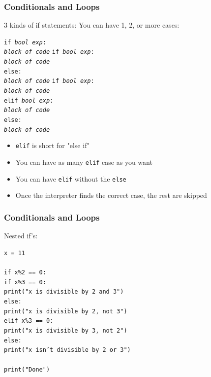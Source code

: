 \documentclass{beamer}
\newcommand{\code}[1]{\texttt{#1}}
\newcommand{\tab}{\hspace*{22pt}}
\begin{document}
\begin{frame}%
	\frametitle{Conditionals and Loops}
	
	\begin{block}{3 kinds of if statements:}
		You can have 1, 2, or more cases:
		
			\code{if \emph{bool exp}: \\
				\tab \emph{block of code}}
		\endminipage\hfill
			\code{if \emph{bool exp}: \\
				\tab \emph{block of code} \\
				else: \\
				\tab \emph{block of code}}
		\endminipage\hfill
			\code{if \emph{bool exp}: \\
				\tab \emph{block of code} \\
				elif \emph{bool exp}: \\
				\tab \emph{block of code} \\
				else: \\
				\tab \emph{block of code}}
		\endminipage\hfill
		
			\begin{itemize}
				\item \code{elif} is short for "else if"
				\item You can have as many \code{elif} case as you want
				\item You can have \code{elif} without the \code{else}
				\item Once the interpreter finds the correct case, the rest are skipped
			\end{itemize}
	\end{block}
	
\end{frame}

\begin{frame}%
	\frametitle{Conditionals and Loops}
	
	\begin{block}{Nested if's:}
		
		\code{x = 11 \\
				\tab \\
				if x\%2 == 0: \\
				\tab if x\%3 == 0: \\
				\tab \tab print("x is divisible by 2 and 3") \\
				\tab else: \\
				\tab \tab print("x is divisible by 2, not 3") \\
				elif x\%3 == 0: \\
				\tab print("x is divisible by 3, not 2") \\
				else: \\
				\tab print("x isn't divisible by 2 or 3") \\
				\tab \\
				print("Done")}
		
	\end{block}
	
\end{frame}
\end{document}
